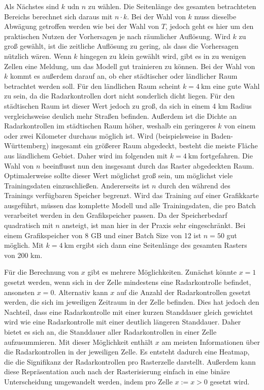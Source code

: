 Als Nächstes sind $k$ udn $n$ zu wählen.
Die Seitenlänge des gesamten betrachteten Bereichs berechnet sich daraus mit $n \cdot k$.
Bei der Wahl von $k$ muss dieselbe Abwägung getroffen werden wie bei der Wahl von $T$, jedoch geht es hier um den praktischen Nutzen der Vorhersagen je nach räumlicher Auflösung.
Wird $k$ zu groß gewählt, ist die zeitliche Auflösung zu gering, als dass die Vorhersagen nützlich wären.
Wenn $k$ hingegen zu klein gewählt wird, gibt es in zu wenigen Zellen eine Meldung, um das Modell gut trainieren zu können.
Bei der Wahl von $k$ kommt es außerdem darauf an, ob eher städtischer oder ländlicher Raum betrachtet werden soll.
Für den ländlichen Raum scheint $k = 4~\text{km}$ eine gute Wahl zu sein, da die Radarkontrollen dort nicht sonderlich dicht liegen.
Für den städtischen Raum ist dieser Wert jedoch zu groß, da sich in einem 4 km Radius vergleichsweise deulich mehr Straßen befinden.
Außerdem ist die Dichte an Radarkontrollen im städtischen Raum höher, weshalb ein geringeres $k$ von einem oder zwei Kilometer durchaus möglich ist.
Wird (beispielsweise in Baden-Württemberg) insgesamt ein größerer Raum abgedeckt, besteht die meiste Fläche aus ländlichem Gebiet.
Daher wird im folgenden mit $k = 4~\text{km}$ fortgefahren.
Die Wahl von $n$ beeinflusst nun den insgesamt durch das Raster abgedeckten Raum.
Optimalerweise sollte dieser Wert möglichst groß sein, um möglichst viele Trainingsdaten einzuschließen.
Andererseits ist $n$ durch den während des Trainings verfügbaren Speicher begrenzt.
Wird das Training auf einer Grafikkarte ausgeführt, müssen das komplette Modell und alle Trainingsdaten, die pro Batch verarbeitet werden in den Grafikspeicher passen.
Da der Speicherbedarf quadratisch mit $n$ ansteigt, ist man hier in der Praxis sehr eingeschränkt.
Bei einem Grafikspeicher von 8 GB und einer Batch Size von 12 ist $n = 50$ gut möglich.
Mit $k = 4~\text{km}$ ergibt sich dann eine Seitenlänge des gesamten Rasters von 200 km.

Für die Berechnung von $x$ gibt es mehrere Möglichkeiten.
Zunächst könnte $x = 1$ gesetzt werden, wenn sich in der Zelle mindestens eine Radarkontrolle befindet, ansonsten $x = 0$.
Alternativ kann $x$ auf die Anzahl der Radarkontrollen gesetzt werden, die sich im jeweiligen Zeitraum in der Zelle befinden.
Dies hat jedoch den Nachteil, dass eine Radarkontrolle mit einer kurzen Standdauer gleich gewichtet wird wie eine Radarkontrolle mit einer deutlich längeren Standdauer.
Daher bietet es sich an, die Standdauer aller Radarkontrollen in einer Zelle aufzusummieren.
Mit dieser Möglichkeit enthält $x$ am meisten Informationen über die Radarkontrollen in der jeweiligen Zelle.
Es entsteht dadurch eine Heatmap, die die Signifikanz der Radarkontrollen pro Rasterzelle darstellt.
Außerdem kann diese Repräsentation auch nach der Rasterisierung einfach in eine binäre Unterscheidung umgewandelt werden, indem pro Zelle $x := x > 0$ gesetzt wird.


